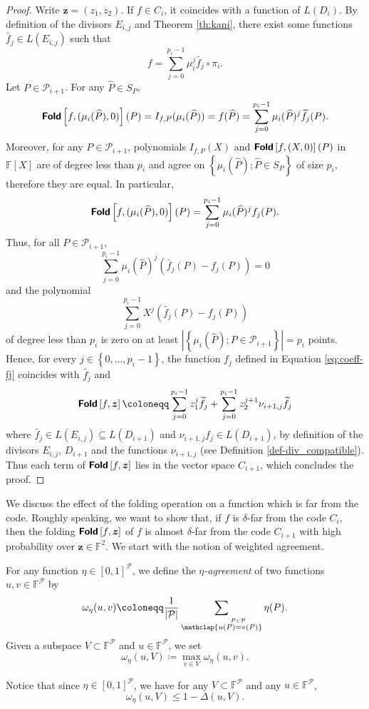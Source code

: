 \documentclass[a4paper,USenglish,autoref]{lipics-v2021}
\renewcommand\hat{\widehat}
\newcommand\F{\mathbb{F}}
\newcommand\fold[1]{\textsf{\textbf{Fold}}\left[#1\right]}
\renewcommand{\hat}{\widehat}
\renewcommand{\vec}[1]{\boldsymbol{#1}}
\newcommand{\set}[1]{\left\{#1\right\}}
\newcommand{\size}[1]{\left|#1\right|}
\newcommand{\range}[1]{\set{0,\dots,#1-1}}
\newcommand\bfz{{\vec{z}}}
\newcommand\calP{\mathcal{P}}
\newcommand\mydef{\coloneqq}
\begin{document}
\begin{proof}
	Write $\bfz=(z_1,z_2)$. If $f \in C_i$, it coincides with a function of $L(D_{i})$. By definition of the divisors $E_{i,j}$ and Theorem \ref{th:kani}, there exist some functions $\widetilde{f_j} \in L(E_{i,j})$ such that
	\[ f= \sum_{j=0}^{p_i-1} \mu_i^j \widetilde{f_j} \circ \pi_i .\]
	Let $P \in \mathcal{P}_{i+1}$.    
	For any $\hat P \in S_P$,
	\[\fold{f,(\mu_i(\hat P),0)}(P) = I_{f, P}(\mu_i(\hat P)) = f(\hat P)=\sum_{j=0}^{p_i-1} \mu_i(\hat P)^j \widetilde{f_j}(P).\]
	Moreover, for any $P \in \calP_{i+1}$, polynomials $I_{f, P}(X)$ and $\fold{f, (X,0)}(P)$ in $\F[X]$ are of degree less than $p_i$ and agree on $\set{\mu_i(\hat P) ; \hat P \in S_P}$ of size $p_i$, therefore they are equal. In particular, 
	\[
	\fold{f, (\mu_i(\hat P),0)}(P) = \sum_{j = 0}^{p_i - 1} \mu_i(\hat P)^j f_j(P).
	\]
	Thus, for all $P \in \calP_{i+1}$, \[\sum_{j=0}^{p_i-1} \mu_i(\hat P)^j (\widetilde{f_j}(P) - f_j(P)) = 0\] and the polynomial \[\sum_{j=0}^{p_i-1} X^j (\widetilde{f_j}(P) - f_j(P))\] of degree less than $p_i$ is zero on at least $\size{\set{\mu_i(\hat P) ; P \in \calP_{i+ 1}}} = p_i$ points. Hence, for every ${j \in \range{p_i}}$, the function $f_j$ defined in Equation \eqref{eq:coeff-fj} coincides with $\widetilde{f_j}$ and
	\[\fold{f, \bfz} \mydef\sum_{j=0}^{p_i-1} z_1^j \widetilde{f_j} + \sum_{j=0}^{p_i-1} z_2^{j+1} \nu_{i+1,j} \widetilde{f_j}\]
	where $\widetilde{f_j} \in L(E_{i,j}) \subseteq L(D_{i+1})$ and $\nu_{i+1,j} f_j \in L(D_{i+1})$, by definition of the divisors $E_{i,j}$, $D_{i+1}$ and the functions $\nu_{i+1,j}$ (see Definition \ref{def-div_compatible}). Thus each term of $\fold{f,\bfz}$ lies in the vector space $C_{i+1}$, which concludes the proof.
\end{proof}

We discuss the effect of the folding operation on a function which is far from the code. Roughly speaking, we want to show that, if $f$ is $\delta$-far from the code $C_i$, then the folding $\fold{f, \bfz}$ of $f$ is almost $\delta$-far from the code $C_{i+1}$ with high probability over $\bfz \in \F^2$. We start with the notion of weighted agreement.

\begin{definition}\label{def:agreement}
	For any function $\eta \in [0,1]^{\calP}$, we define the \emph{$\eta$-agreement} of two functions $u,v \in \F^\calP$ by
	\[\omega_\eta(u,v) \mydef\frac{1}{|\calP|} \sum_{\mathclap{\stackrel{P \in \calP}{u(P) = v(P)}}} \eta(P).\]
	Given a subspace $V \subset \F^\calP$ and $u \in \F^\calP$, we set \[\omega_\eta(u,V) \mydef \max_{v \in V} \omega_\eta(u,v).\]
\end{definition}
Notice that since $\eta \in [0,1]^\calP$, we have for any $V \subset \F^\calP$ and any $u \in \F^\calP$,
\begin{equation}\label{eq:eta<1}
	\omega_\eta(u,V) \leq 1 - \Delta(u,V).
\end{equation}
\end{document}
